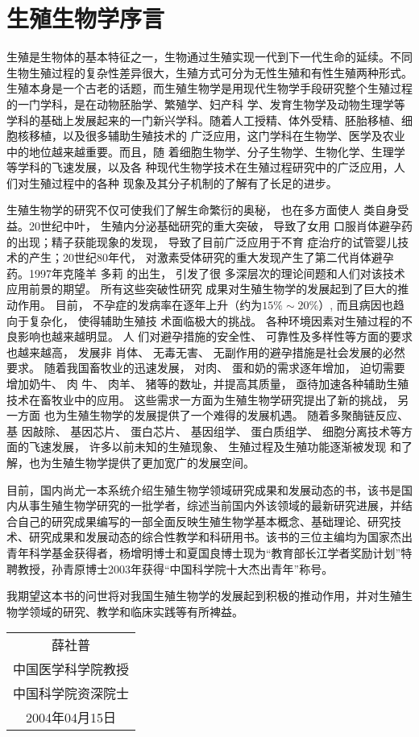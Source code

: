 \chapter{生殖生物学序言}
\newpage
生殖是生物体的基本特征之一，生物通过生殖实现一代到下一代生命的延续。不同生物生殖过程的复杂性差异很大，生殖方式可分为无性生殖和有性生殖两种形式。生殖本身是一个古老的话题，而生殖生物学是用现代生物学手段研究整个生殖过程的一门学科，是在动物胚胎学、繁殖学、妇产科 学、发育生物学及动物生理学等学科的基础上发展起来的一门新兴学科。随着人工授精、体外受精、胚胎移植、细胞核移植，以及很多辅助生殖技术的 广泛应用，这门学科在生物学、医学及农业中的地位越来越重要。而且，随 着细胞生物学、分子生物学、生物化学、生理学等学科的飞速发展，以及各 种现代生物学技术在生殖过程研究中的广泛应用，人们对生殖过程中的各种 现象及其分子机制的了解有了长足的进步。

生殖生物学的研究不仅可使我们了解生命繁衍的奥秘， 也在多方面使人
类自身受益。20世纪中叶， 生殖内分泌基础研究的重大突破， 导致了女用 口服肖体避孕药的出现；精子获能现象的发现， 导致了目前广泛应用于不育 症治疗的试管婴儿技术的产生；20世纪80年代， 对激素受体研究的重大发现产生了第二代肖体避孕药。1997年克隆羊 多莉 的出生， 引发了很 多深层次的理论间题和人们对该技术应用前景的期望。 所有这些突破性研究 成果对生殖生物学的发展起到了巨大的推动作用。 目前， 不孕症的发病率在逐年上升（约为$ 15\% \sim 20\% $）, 而且病因也趋向于复杂化， 使得辅助生殖技 术面临极大的挑战。 各种环境因素对生殖过程的不良影响也越来越明显。 人 们对避孕措施的安全性、 可靠性及多样性等方面的要求也越来越高， 发展非 肖体、 无毒无害、 无副作用的避孕措施是社会发展的必然要求。 随着我国畜牧业的迅速发展， 对肉、 蛋和奶的需求逐年增加， 迫切需要增加奶牛、 肉 牛、 肉羊、 猪等的数址，并提高其质量， 亟待加速各种辅助生殖技术在畜牧业中的应用。 这些需求一方面为生殖生物学研究提出了新的挑战， 另一方面 也为生殖生物学的发展提供了一个难得的发展机遇。 随着多聚酶链反应、 基 因敲除、 基因芯片、 蛋白芯片、 基因组学、 蛋白质组学、 细胞分离技术等方 面的飞速发展， 许多以前未知的生殖现象、 生殖过程及生殖功能逐渐被发现 和了解，也为生殖生物学提供了更加宽广的发展空间。

目前，国内尚尤一本系统介绍生殖生物学领域研究成果和发展动态的书，该书是国内从事生殖生物学研究的一批学者，综述当前国内外该领域的最新研究进展，并结合自己的研究成果编写的一部全面反映生殖生物学基本概念、基础理论、研究技术、研究成果和发展动态的综合性教学和科研用书。该书的三位主编均为国家杰出青年科学基金获得者，杨增明博士和夏国良博士现为“教育部长江学者奖励计划”特聘教授，孙青原博士2003年获得“中国科学院十大杰出青年”称号。

我期望这本书的问世将对我国生殖生物学的发展起到积极的推动作用，并对生殖生物学领域的研究、教学和临床实践等有所裨益。

\begin{flushright}
\kaishu 
\begin{tabular}{c}
{\huge 薛社普}\\  
中国医学科学院教授 \\  
中国科学院资深院士 \\  
2004年04月15日 \\  
\end{tabular} 
\end{flushright}